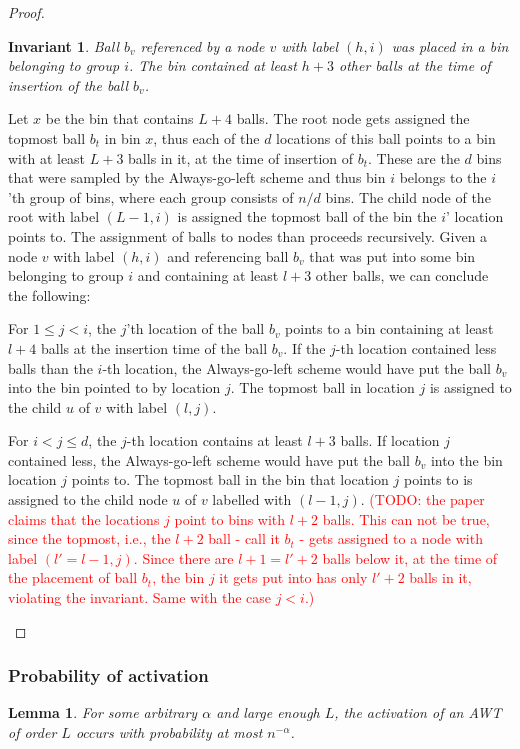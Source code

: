 \documentclass[a4paper,12pt]{article}
\newcommand\todo[1]{\textcolor{red}{(TODO: #1)}}
\newtheorem{lemma}{Lemma}
\newtheorem{invariant}{Invariant}
\begin{document}
\begin{proof}
\begin{invariant}
Ball $b_v$ referenced by a node $v$ with label $(h,i)$ was placed in a bin belonging to group $i$. The bin contained at least $h+3$ other balls at the time of insertion of the ball $b_v$.
\end{invariant}
Let $x$ be the bin that contains $L+4$ balls. The root node gets assigned the topmost ball $b_t$ in bin $x$, thus each of the $d$ locations of this ball points to a bin with at least $L+3$ balls in it, at the time of insertion of $b_t$. These are the $d$ bins that were sampled by the Always-go-left scheme and thus bin $i$ belongs to the $i$'th group of bins, where each group consists of $n/d$ bins. The child node of the root with label $(L-1, i)$ is assigned the topmost ball of the bin the $i$' location points to. The assignment of balls to nodes than proceeds recursively. Given a node $v$ with label $(h, i)$ and referencing ball $b_v$ that was put into some bin belonging to group $i$ and containing at least $l+3$ other balls, we can conclude the following:
\begin{compactitem}
\item For $1\leq j < i$, the $j$'th location of the ball $b_v$ points to a bin containing at least $l+4$ balls at the insertion time of the ball $b_v$. If the $j$-th location contained less balls than the $i$-th location, the Always-go-left scheme would have put the ball $b_v$ into the bin pointed to by location $j$. The topmost ball in location $j$ is assigned to the  child $u$ of $v$ with label $(l,j)$. 
\item For $i < j \leq d$, the $j$-th location contains at least $l+3$ balls. If location $j$ contained less, the Always-go-left scheme would have put the ball $b_v$ into the bin location $j$ points to. The topmost ball in the bin that location $j$ points to is assigned to the child node $u$ of $v$ labelled with $(l-1, j)$. \todo{the paper claims that the locations $j$ point to bins with $l+2$ balls. This can not be true, since the topmost, i.e., the $l+2$ ball - call it $b_t$ - gets assigned to a node with label $(l'=l-1, j)$. Since there are $l+1=l'+2$ balls below it, at the time of the placement of ball $b_t$, the bin $j$ it gets put into has only $l'+2$ balls in it, violating the invariant. Same with the case $j<i$.} 
\end{compactitem}
\end{proof}

\subsubsection{Probability of activation}
\label{sec:analysis:probabilityAsymWT}
\begin{lemma}\label{lemma:awt:activation}
For some arbitrary $\alpha$ and large enough $L$, the activation of an AWT of order $L$ occurs with probability at most $n^{-\alpha}$.
\end{lemma}
\end{document}

